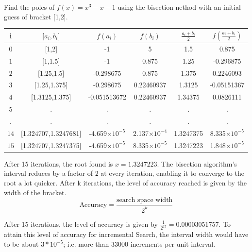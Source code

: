 \documentclass[book.tex]{subfiles}
\begin{document}
\begin{example} Find the poles of $f(x) = x^3 - x - 1$ using the bisection nethod with an initial guess of bracket [1,2]. 
\begin{table}
	\begin{tabular}{|cc|cc|cc|}
		\hline
		\textbf{i} & \textbf{[$a_i,b_i$]} & \textbf{$f(a_i)$} & \textbf{$f(b_i)$} & \textbf{$\frac{a_i+b_i}{2}$} & \textbf{$f(\frac{a_i+b_i}{2})$}\\\hline
		$0$ & [1,2] & -1 & 5 & 1.5 & 0.875 \\\hline
		
		$1$ & [1,1.5] & -1 & 0.875 & 1.25 & -0.296875  \\\hline
		
		$2$ & [1.25,1.5] & -0.298675 & 0.875 & 1.375 & 0.2246093\\\hline
		
		$3$ & [1.25,1.375] &  -0.298675 & 0.22460937 & 1.3125 & -0.05151367 \\ \hline
		
		$4$ & [1.3125,1.375] & -0.051513672 & 0.22460937 & 1.34375 & 0.0826111\\ \hline
		
		$5$ & . & . & . & . & .\\ \hline
		
		$.$ & . & . & . & . & .\\ \hline
		
		$14$ & [1.324707,1.3247681] & -4.659$\times 10^{-5}$ & 2.137$\times 10^{-4}$ & 1.3247375 & 8.335$\times 10^{-5}$\\ \hline
		$15$ & [1.324707,1.3247375] & -4.659$\times 10^{-5}$ & 8.335$\times 10^{-5}$ & 1.3247223 & 1.848$\times 10^{-5}$\\ \hline
	\end{tabular}
\end{table}

After 15 iterations, the root found is $x = 1.3247223$. The bisection algorithm's interval reduces by a factor of 2 at every iteration, enabling it to converge to the root a lot quicker. After k iterations, the level of accuracy reached is given by the width of the bracket. 
\begin{equation}
\text{Accuracy}  = \frac{\text{search space width}}{2^k}
\end{equation}

After 15 iterations, the level of accuracy is given by $ \frac{1}{2^{15}} = 0.00003051757$. To attain this level of accuracy for incremental Search, the interval width would have to be about $3*10^{-5}$; i.e. more than 33000 increments per unit interval.
\end{example}
\end{document}
